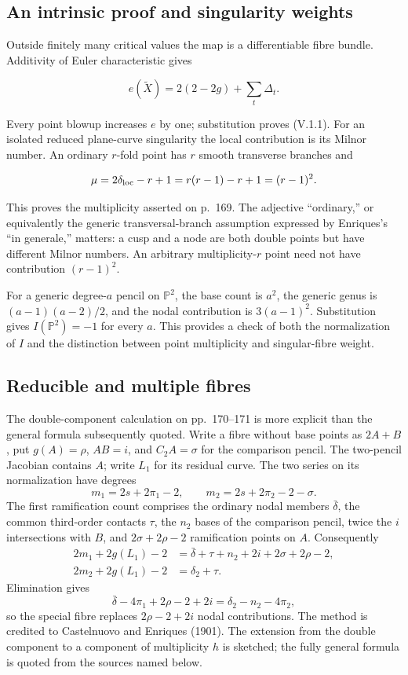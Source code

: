 \subsection{An intrinsic proof and singularity weights}

Outside finitely many critical values the map is a differentiable fibre bundle. Additivity of Euler characteristic gives

\[
e(\widetilde X)=2(2-2g)+\sum_t\Delta_t.
\]

Every point blowup increases \(e\) by one; substitution proves (V.1.1). For an isolated reduced plane-curve singularity the local contribution is its Milnor number. An ordinary \(r\)-fold point has \(r\) smooth transverse branches and

\[
\mu=2\delta_{\rm loc}-r+1=r(r-1)-r+1=(r-1)^2.
\]

This proves the multiplicity asserted on p.~169. The adjective ``ordinary,'' or equivalently the generic transversal-branch assumption expressed by Enriques's ``in generale,'' matters: a cusp and a node are both double points but have different Milnor numbers. An arbitrary multiplicity-\(r\) point need not have contribution \((r-1)^2\).

For a generic degree-\(a\) pencil on \(\mathbb P^2\), the base count is \(a^2\), the generic genus is \((a-1)(a-2)/2\), and the nodal contribution is \(3(a-1)^2\). Substitution gives \(I(\mathbb P^2)=-1\) for every \(a\). This provides a check of both the normalization of \(I\) and the distinction between point multiplicity and singular-fibre weight.

\subsection{Reducible and multiple fibres}

The double-component calculation on pp.~170--171 is more explicit than the general formula subsequently quoted. Write a fibre without base points as \(2A+B\), put \(g(A)=\rho\), \(AB=i\), and \(C_2A=\sigma\) for the comparison pencil. The two-pencil Jacobian contains \(A\); write \(L_1\) for its residual curve. The two series on its normalization have degrees \[
m_1=2s+2\pi_1-2,\qquad m_2=2s+2\pi_2-2-\sigma.
\] The first ramification count comprises the ordinary nodal members \(\bar\delta\), the common third-order contacts \(\tau\), the \(n_2\) bases of the comparison pencil, twice the \(i\) intersections with \(B\), and \(2\sigma+2\rho-2\) ramification points on \(A\). Consequently \[
\begin{aligned}
2m_1+2g(L_1)-2&=\bar\delta+\tau+n_2+2i+2\sigma+2\rho-2,\\
2m_2+2g(L_1)-2&=\delta_2+\tau.
\end{aligned}
\] Elimination gives \[
\bar\delta-4\pi_1+2\rho-2+2i=\delta_2-n_2-4\pi_2,
\] so the special fibre replaces \(2\rho-2+2i\) nodal contributions. The method is credited to Castelnuovo and Enriques (1901). The extension from the double component to a component of multiplicity \(h\) is sketched; the fully general formula is quoted from the sources named below.

